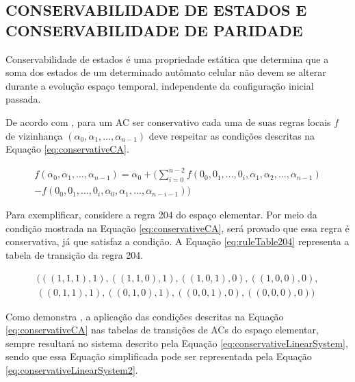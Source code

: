 \documentclass[12pt,a4paper]{article}
\begin{document}
	\subsection{CONSERVABILIDADE DE ESTADOS E CONSERVABILIDADE DE PARIDADE}
	Conservabilidade de estados é uma propriedade estática que determina que a soma dos estados de um determinado autômato celular não devem se alterar durante a evolução espaço temporal, independente da configuração inicial passada.

	De acordo com \cite{boccara2002}, para um AC ser conservativo cada uma de suas regras locais $f$ de vizinhança $(\alpha_0,\alpha_1, \dots, \alpha_{n-1})$ deve respeitar as condições descritas na Equação \ref{eq:conservativeCA}.

	\begin{equation}
	\begin{split}
	f(\alpha_0,\alpha_1, \dots,\alpha_{n-1}) = \alpha_0 + (\sum_{i=0}^{n-2}f(0_0,0_1, \dots,0_i,\alpha_1,\alpha_2, \dots,\alpha_{n-1}) \\- f(0_0,0_1, \dots,0_i,\alpha_0,\alpha_1, \dots,\alpha_{n-i-1}))
	\label{eq:conservativeCA}
	\end{split}
	\end{equation}

	Para exemplificar, considere a regra 204 do espaço elementar. Por meio da condição mostrada na Equação \ref{eq:conservativeCA}, será provado que essa regra é conservativa, já que satisfaz a condição. A Equação \ref{eq:ruleTable204} representa a tabela de transição da regra 204.

	\begin{equation}
	\begin{split}
	(((1,1,1),1),((1,1,0),1),((1,0,1),0),((1,0,0),0),\\((0,1,1),1),((0,1,0),1),((0,0,1),0),((0,0,0),0))
	\label{eq:ruleTable204}
	\end{split}
	\end{equation}

	Como demonstra \cite{daCosta2014}, a aplicação das condições descritas na Equação \ref{eq:conservativeCA} nas tabelas de transições de ACs do espaço elementar, sempre resultará no sistema descrito pela Equação \ref{eq:conservativeLinearSystem}, sendo que essa Equação simplificada pode ser representada pela Equação \ref{eq:conservativeLinearSystem2}.
\end{document}
